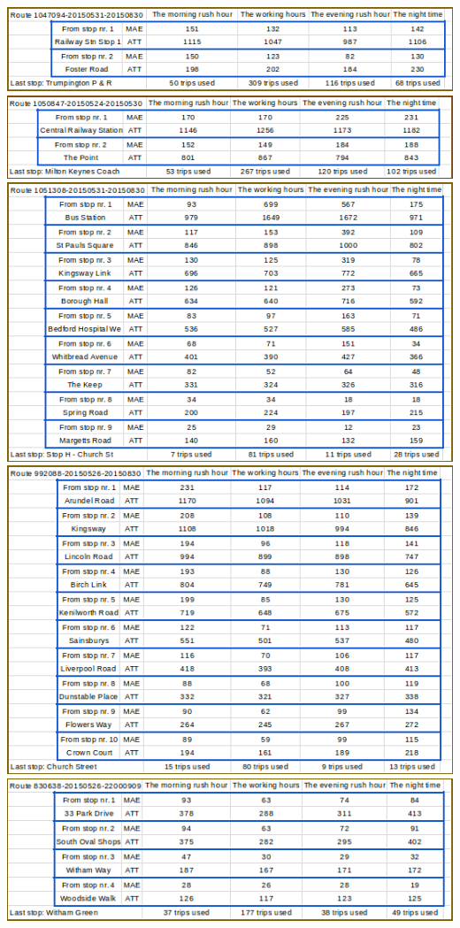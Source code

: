 \documentclass[12pt,a4paper,oneside,openright]{report}
\begin{document}
\includegraphics[width=\textwidth]{figs/table_of_1047094.png}
\includegraphics[width=\textwidth]{figs/table_of_1050847.png}
\includegraphics[width=\textwidth]{figs/table_of_1051308.png}
\includegraphics[width=\textwidth]{figs/table_of_992088.png}
\includegraphics[width=\textwidth]{figs/table_of_830638.png}
\end{document}

